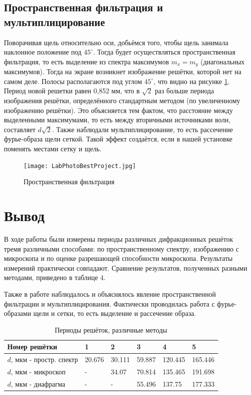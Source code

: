 \documentclass[a4paper]{article}
\begin{document}
\subsection{Пространственная фильтрация и мультиплицирование}

Поворачивая щель относительно оси, добьёмся того, чтобы щель занимала наклонное положение под $45^\circ$. Тогда будет осуществляться пространственная фильтрация, то есть выделение из спектра максимумов $m_x = m_y$ (диагональных максимумов). Тогда на экране возникнет изображение решётки, которой нет на самом деле. Полосы располагаются под углом $45^\circ$, что видно на рисунке \ref{filtr}. Период новой решетки равен 0,852 мм, что в $\sqrt{2}$ раз больше периода изображения решётки, определённого стандартным методом (по увеличенному изображению решётки). Это объясняется тем фактом, что расстояние между выделенными максимумами, то есть между вторичными источниками волн, составляет $d\sqrt{2}$. Также наблюдали мультиплицирование, то есть рассечение фурье-образа щели сеткой. Такой эффект создаётся, если в нашей установке поменять местами сетку и щель.

\begin{figure}[h]
    \centering
    \texttt{[image: LabPhotoBestProject.jpg]}
    \caption{Пространственная фильтрация}
    \label{filtr}
\end{figure}

\section{Вывод}

В ходе работы были измерены периоды различных дифракционных решёток тремя различными способами: по пространственному спектру, изображению с микроскопа и по оценке разрешающей способности микроскопа. Результаты измерений практически совпадают. Сравнение результатов, полученных разными методами, приведено в таблице 4. 

Также в работе наблюдалось и объяснялось явление пространственной фильтрации и мультиплицирования. Фактически проводилась работа с фурье-образами щели и сетки, то есть выделение и рассечение образа.

     \begin{table}[h]
    \centering
    \begin{center}
    \caption{Периоды решёток, различные методы}
    \end{center}
    \vspace{0.1cm}
    \label{tab:my_label}
    \begin{tabular}{ |p{4cm}||p{1.2cm}|p{1.2cm}|p{1.2cm}|p{1.2cm}|p{1.2cm}|}
 \hline
Номер решётки & 1 & 2 & 3 & 4 & 5\\
 \hline
 $d$, мкм - простр. спектр  & 20.676 & 30.111 & 59.887 & 120.445 & 165.446 \\
 \hline
 $d$, мкм - микроскоп & - & 34.07 & 70.814 & 135.465 & 191.698 \\
 \hline
 $d$, мкм - диафрагма  & - & - & 55.496 & 137.75 & 177.333 \\

 \hline
 
\end{tabular}
\end{table}   
\end{document}
